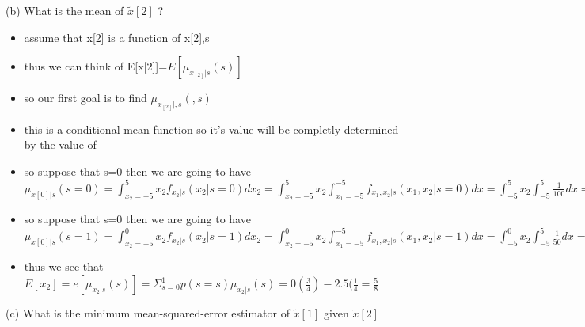 \documentclass[10pt]{article}
\begin{document}
(b) What is the mean of $\tilde{x}[2]$ ?
\begin{itemize}
    \item assume that x[2] is a function of x[2],s 
    \item thus we can think of E[x[2]]=$E[\mu_{x_[2]|s}(s)]$
    \item so our first goal is to find $\mu_{x_[2]|,s}(,s)$ 
    \item this is a conditional mean function so it's value will be completly determined by the value of \s
   \item so suppose that s=0 then we are going to have $\mu_{x[0]|s}(s=0)=\int_{x_2=-5}^{5}x_2f_{x_2|s}(x_2|s=0)dx_2=
   \int_{x_2=-5}^{5}x_2\int_{x_1=-5}^{-5}f_{x_1,x_2|s}(x_1,x_2|s=0)dx=\int_{-5}^{5}x_2\int_{-5}^{5}\frac{1}{100}dx=0$
   \item so suppose that s=0 then we are going to have $\mu_{x[0]|s}(s=1)=\int_{x_2=-5}^{0}x_2f_{x_2|s}(x_2|s=1)dx_2=
   \int_{x_2=-5}^{0}x_2\int_{x_1=-5}^{-5}f_{x_1,x_2|s}(x_1,x_2|s=1)dx=\int_{-5}^{0}x_2\int_{-5}^{5}\frac{1}{50}dx=\frac{1}{5}\int_{x=-5}^{0}xdx=2.5$
   \item thus we see that $E[x_2]=e[\mu_{x_2|s}(s)]=\Sigma_{s=0}^{1}p(s=s)\mu_{x_2|s}(s)=0(\frac{3}{4})-2.5(\frac{1}{4}=\frac{5}{8}$
\end{itemize}
(c) What is the minimum mean-squared-error estimator of $\tilde{x}[1]$ given $\tilde{x}[2]$
\end{document}
